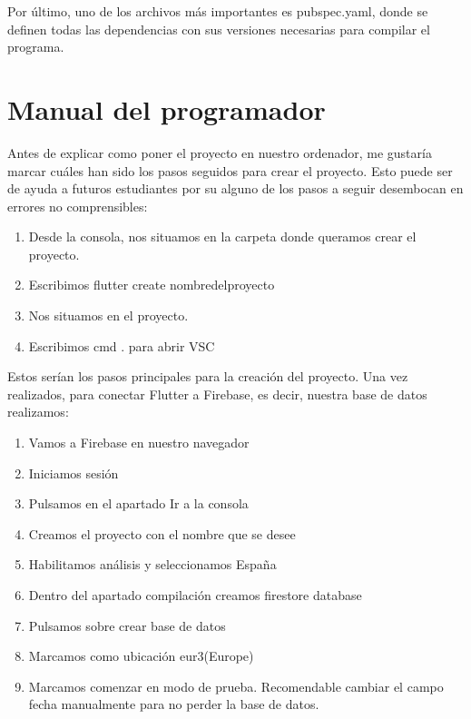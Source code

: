 	Por último, uno de los archivos más importantes es pubspec.yaml, donde se definen todas las dependencias con sus versiones necesarias para compilar el programa.

\section{Manual del programador}

	Antes de explicar como poner el proyecto en nuestro ordenador, me gustaría marcar cuáles han sido los pasos seguidos para crear el proyecto. Esto puede ser de ayuda a futuros estudiantes por su alguno de los pasos a seguir desembocan en errores no comprensibles:
	\begin{enumerate}
		\item Desde la consola, nos situamos en la carpeta donde queramos crear el proyecto.
		\item Escribimos flutter create nombredelproyecto
		\item Nos situamos en el proyecto.
		\item Escribimos cmd . para abrir VSC
	\end{enumerate}
	
	Estos serían los pasos principales para la creación del proyecto. Una vez realizados, para conectar Flutter a Firebase, es decir, nuestra base de datos realizamos:
	\begin{enumerate}
		\item Vamos a Firebase en nuestro navegador
		\item Iniciamos sesión
		\item Pulsamos en el apartado Ir a la consola
		\item Creamos el proyecto con el nombre que se desee
		\item Habilitamos análisis y seleccionamos España
		\item Dentro del apartado compilación creamos firestore database
		\item Pulsamos sobre crear base de datos
		\item Marcamos como ubicación eur3(Europe)
		\item Marcamos comenzar en modo de prueba. Recomendable cambiar el campo fecha manualmente para no perder la base de datos.
	\end{enumerate}
	
